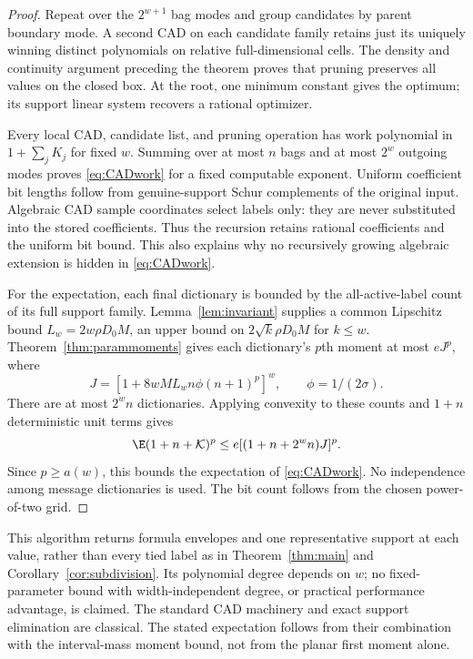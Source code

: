 \begin{proof}
Repeat over the $2^{w+1}$ bag modes and group candidates by parent boundary
mode. A second CAD on each candidate family retains just its uniquely
winning distinct polynomials on relative full-dimensional cells. The density
and continuity argument preceding the theorem proves that pruning preserves
all values on the closed box. At the root, one minimum constant gives the
optimum; its support linear system recovers a rational optimizer.

Every local CAD, candidate list, and pruning operation has work polynomial
in $1+\sum_jK_j$ for fixed $w$. Summing over at most $n$ bags and at most
$2^w$ outgoing modes proves \eqref{eq:CADwork} for a fixed computable
exponent. Uniform coefficient bit lengths follow from genuine-support Schur
complements of the original input. Algebraic CAD sample coordinates select
labels only: they are never substituted into the stored coefficients.
Thus the recursion retains rational coefficients and the uniform bit bound.
This also explains why no recursively growing algebraic extension is hidden
in \eqref{eq:CADwork}.

For the expectation, each final dictionary is bounded by the all-active-label
count of its full support family. Lemma~\ref{lem:invariant} supplies a
common Lipschitz bound $L_w=2w\rho D_0M$, an upper bound on
$2\sqrt{k}\rho D_0M$ for $k\le w$. Theorem~\ref{thm:parammoments}
gives each dictionary's $p$th moment at most $eJ^p$, where
\[
 J=[1+8wML_wn\phi(n+1)^p]^w,\qquad \phi=1/(2\sigma).
\]
There are at most $2^wn$ dictionaries. Applying convexity to these counts
and $1+n$ deterministic unit terms gives
\[
 \E(1+n+\mathcal K)^p\le e[(1+n+2^wn)J]^p.
\]
Since $p\ge a(w)$, this bounds the expectation of \eqref{eq:CADwork}.
No independence among message dictionaries is used. The bit count follows
from the chosen power-of-two grid.
\end{proof}

This algorithm returns formula envelopes and one representative support at
each value, rather than every tied label as in Theorem~\ref{thm:main} and
Corollary~\ref{cor:subdivision}. Its polynomial degree depends on $w$;
no fixed-parameter bound with width-independent degree, or practical
performance advantage, is claimed. The standard CAD machinery and exact
support elimination are classical. The stated expectation follows from
their combination with the interval-mass moment bound, not from the planar
first moment alone.
